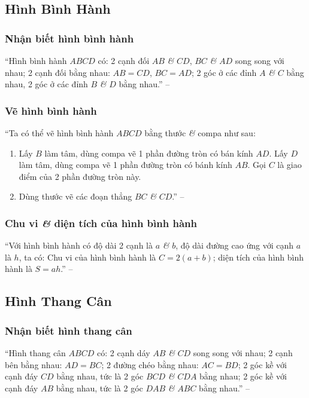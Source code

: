 \documentclass{article}
\numberwithin{equation}{section}
\begin{document}
\subsection{Hình Bình Hành}

\subsubsection{Nhận biết hình bình hành}
``Hình bình hành $ABCD$ có: 2 cạnh đối $AB$ \textit{\&} $CD$, $BC$ \textit{\&} $AD$ song song với nhau; 2 cạnh đối bằng nhau: $AB = CD$, $BC = AD$; 2 góc ở các đỉnh $A$ \textit{\&} $C$ bằng nhau, 2 góc ở các đỉnh $B$ \textit{\&} $D$ bằng nhau.'' -- \cite[p. 102]{SGK_Toan_6_Canh_Dieu_tap_1}

\subsubsection{Vẽ hình bình hành}
``Ta có thể vẽ hình bình hành $ABCD$ bằng thước \textit{\&} compa như sau:
\begin{enumerate}
	\item Lấy $B$ làm tâm, dùng compa vẽ 1 phần đường tròn có bán kính $AD$. Lấy $D$ làm tâm, dùng compa vẽ 1 phần đường tròn có bánh kính $AB$. Gọi $C$ là giao điểm của 2 phần đường tròn này.
	\item Dùng thước vẽ các đoạn thẳng $BC$ \textit{\&} $CD$.'' -- \cite[p. 103]{SGK_Toan_6_Canh_Dieu_tap_1}
\end{enumerate}

\subsubsection{Chu vi \textit{\&} diện tích của hình bình hành}
``Với hình bình hành có độ dài 2 cạnh là $a$ \textit{\&} $b$, độ dài đường cao ứng với cạnh $a$ là $h$, ta có: Chu vi của hình bình hành là $C = 2(a + b)$; diện tích của hình bình hành là $S = ah$.'' -- \cite[p. 103]{SGK_Toan_6_Canh_Dieu_tap_1}


\subsection{Hình Thang Cân}

\subsubsection{Nhận biết hình thang cân}
``Hình thang cân $ABCD$ có: 2 cạnh dáy $AB$ \textit{\&} $CD$ song song với nhau; 2 cạnh bên bằng nhau: $AD = BC$; 2 đường chéo bằng nhau: $AC = BD$; 2 góc kề với cạnh đáy $CD$ bằng nhau, tức là 2 góc $BCD$ \textit{\&} $CDA$ bằng nhau; 2 góc kề với cạnh đáy $AB$ bằng nhau, tức là 2 góc $DAB$ \textit{\&} $ABC$ bằng nhau.'' -- \cite[p. 105]{SGK_Toan_6_Canh_Dieu_tap_1}
\end{document}
